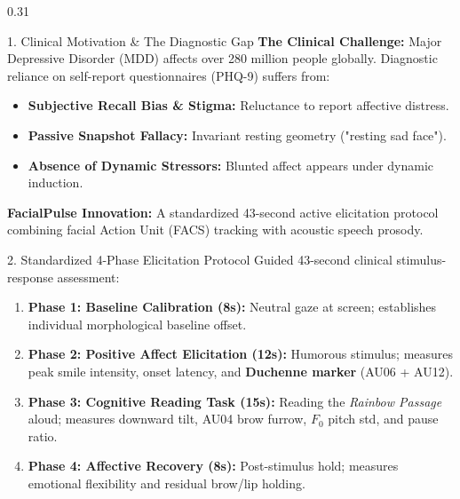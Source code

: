 \documentclass[final]{beamer}
\begin{document}
\begin{frame}[t]
\begin{columns}[t]
\begin{column}{0.31\textwidth}
    \begin{posterbox}{1. Clinical Motivation \& The Diagnostic Gap}
      \textbf{The Clinical Challenge:} Major Depressive Disorder (MDD) affects over 280 million people globally. Diagnostic reliance on self-report questionnaires (PHQ-9) suffers from:
      \begin{itemize}
        \item \textbf{Subjective Recall Bias \& Stigma:} Reluctance to report affective distress.
        \item \textbf{Passive Snapshot Fallacy:} Invariant resting geometry ("resting sad face").
        \item \textbf{Absence of Dynamic Stressors:} Blunted affect appears under dynamic induction.
      \end{itemize}
      \vspace{0.2cm}
      \begin{tcolorbox}[colback=MedBlue!10,colframe=MedBlue,arc=1.5mm,boxrule=1pt]
        \small\textbf{FacialPulse Innovation:} A standardized 43-second active elicitation protocol combining facial Action Unit (FACS) tracking with acoustic speech prosody.
      \end{tcolorbox}
    \end{posterbox}

    \vspace{0.3cm}

    \begin{posterbox}{2. Standardized 4-Phase Elicitation Protocol}
      Guided 43-second clinical stimulus-response assessment:
      \begin{enumerate}
        \item \textbf{Phase 1: Baseline Calibration (8s):} Neutral gaze at screen; establishes individual morphological baseline offset.
        \item \textbf{Phase 2: Positive Affect Elicitation (12s):} Humorous stimulus; measures peak smile intensity, onset latency, and \textbf{Duchenne marker} (AU06 + AU12).
        \item \textbf{Phase 3: Cognitive Reading Task (15s):} Reading the \textit{Rainbow Passage} aloud; measures downward tilt, AU04 brow furrow, $F_0$ pitch std, and pause ratio.
        \item \textbf{Phase 4: Affective Recovery (8s):} Post-stimulus hold; measures emotional flexibility and residual brow/lip holding.
      \end{enumerate}
    \end{posterbox}


\end{column}
\end{columns}
\end{frame}
\end{document}
